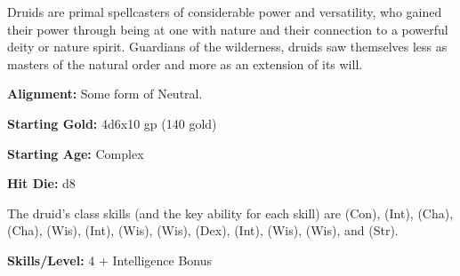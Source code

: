 
Druids are primal spellcasters of considerable power and versatility, who gained their power through being at one with nature and their connection to a powerful deity or nature spirit. Guardians of the wilderness, druids saw themselves less as masters of the natural order and more as an extension of its will.

\textbf{Alignment:} Some form of Neutral.

\textbf{Starting Gold:} 4d6x10 gp (140 gold)

\textbf{Starting Age:} Complex

\textbf{Hit Die:} d8

The druid's class skills (and the key ability for each skill) are  (Con),  (Int),  (Cha),  (Cha),  (Wis),  (Int),  (Wis),  (Wis),  (Dex),  (Int),  (Wis),  (Wis), and  (Str).

\textbf{Skills/Level:} 4 + Intelligence Bonus

\modebab{}
\poorfor{}
\poorref{}
\goodwil{}

